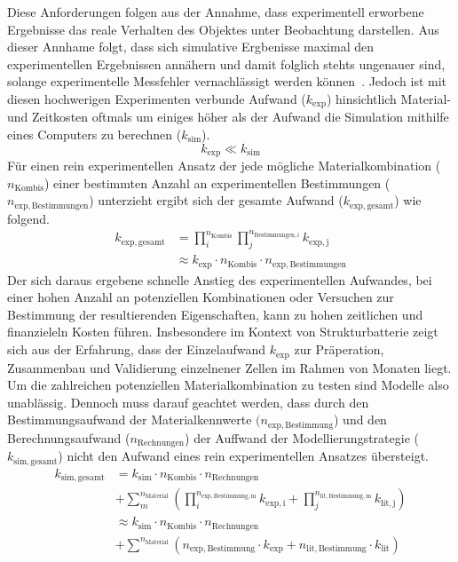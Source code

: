 Diese Anforderungen folgen aus der Annahme, dass experimentell erworbene Ergebnisse das reale Verhalten des Objektes unter Beobachtung darstellen. Aus dieser Annhame folgt, dass sich simulative Ergbenisse maximal den experimentellen Ergebnissen annähern und damit folglich stehts ungenauer sind, solange experimentelle Messfehler vernachlässigt werden können~\cite{Morris2024}. Jedoch ist mit diesen hochwerigen Experimenten verbunde Aufwand ($k_{\mathrm{exp}}$) hinsichtlich Material-  und Zeitkosten oftmals um einiges höher als der Aufwand die Simulation mithilfe eines Computers zu berechnen ($k_{\mathrm{sim}}$).
\begin{equation}
    k_{\mathrm{exp}} \ll k_{\mathrm{sim}} 
\end{equation}
Für einen rein experimentellen Ansatz der jede mögliche Materialkombination ($n_{\mathrm{Kombis}}$) einer bestimmten Anzahl an experimentellen Bestimmungen ($n_{\mathrm{exp,Bestimmungen}}$) unterzieht ergibt sich der gesamte Aufwand ($k_{\mathrm{exp, gesamt}}$) wie folgend.
\begin{align}
    k_{\mathrm{exp, gesamt}} &= \prod_{i}^{n_{\mathrm{Kombis}}}\prod_{j}^{n_{\mathrm{Bestimmungen,i}}} k_{\mathrm{exp,j}}\\
    &\approx k_{\mathrm{exp}} \cdot n_{\mathrm{Kombis}} \cdot n_{\mathrm{exp,Bestimmungen}}
\end{align}
Der sich daraus ergebene schnelle Anstieg des experimentellen Aufwandes, bei einer hohen Anzahl an potenziellen Kombinationen oder Versuchen zur Bestimmung der resultierenden Eigenschaften, kann zu hohen zeitlichen und finanzieleln Kosten führen. Insbesondere im Kontext von Strukturbatterie zeigt sich aus der Erfahrung, dass der Einzelaufwand $k_{\mathrm{exp}}$ zur Präperation, Zusammenbau und Validierung einzelnener Zellen im Rahmen von Monaten liegt.
Um die zahlreichen potenziellen Materialkombination zu testen sind Modelle also unablässig. Dennoch muss darauf geachtet werden, dass durch den Bestimmungsaufwand der Materialkennwerte $(n_{\mathrm{exp, Bestimmung}}$) und den Berechnungsaufwand ($n_{\mathrm{Rechnungen}}$) der Auffwand der Modellierungstrategie ($k_{\mathrm{sim, gesamt}}$) nicht den Aufwand eines rein experimentellen Ansatzes übersteigt.
\begin{align}
    k_{\mathrm{sim, gesamt}}
    &= k_{\mathrm{sim}} \cdot n_{\mathrm{Kombis}} \cdot n_{\mathrm{Rechnungen}} \nonumber \\
    &+ \sum_{m}^{n_{\mathrm{Material}}} \left( \prod_{i}^{n_{\mathrm{exp, Bestimmung, m}}}k_{\mathrm{exp,i}} + \prod_{j}^{n_{\mathrm{lit, Bestimmung, m}}} k_{\mathrm{lit,j}} \right)\\
    &\approx k_{\mathrm{sim}} \cdot n_{\mathrm{Kombis}} \cdot n_{\mathrm{Rechnungen}} \nonumber \\
    &+ \sum_{}^{n_{\mathrm{Material}}} \left( n_{\mathrm{exp, Bestimmung}} \cdot k_{\mathrm{exp}} + n_{\mathrm{lit, Bestimmung}} \cdot k_{\mathrm{lit}} \right)
\end{align}
